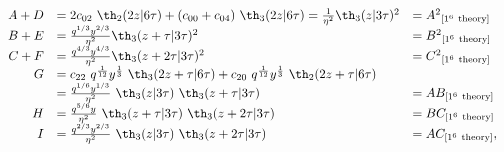 \begin{equation} \label{1^6-4^3}
  \begin{array}{rll}
A+D &= 2 c_{02} ~\th_2(2z|6\tau) +(c_{00}+c_{04}) ~\th_3(2z|6\tau)
= {1\over \eta^2} \th_3(z|3\tau)^2 &= A^2{ }_{[1^6 ~{\rm theory}]} \\
B+E &= {q^{1/3} y^{2/3}\over \eta^2} \th_3 (z+\tau|3\tau)^2 &= B^2{ }_{[1^6 ~{\rm theory}]} \\
C+F &= {q^{4/3} y^{4/3}\over \eta^2} \th_3 (z+2\tau|3\tau)^2 &= C^2{ }_{[1^6 ~{\rm theory}]} \\
G &= c_{22} ~q^{1\over 12} y^{1\over 3} ~\th_3(2z+\tau|6\tau) + 
 c_{20} ~q^{1\over 12} y^{1\over 3} ~\th_2(2z+\tau|6\tau) & \\
&= {q^{1/6} y^{1/3} \over \eta^2} ~\th_3(z|3\tau)~\th_3(z+\tau|3\tau) &= AB_{[1^6 ~{\rm theory}]} \\
H &= {q^{5/6} y \over \eta^2} ~\th_3(z+\tau|3\tau)~\th_3(z+2\tau|3\tau) &= BC_{[1^6 ~{\rm theory}]} \\
I &= {q^{2/3} y^{2/3} \over \eta^2} ~\th_3(z|3\tau)~\th_3(z+2\tau|3\tau) &= AC_{[1^6 ~{\rm theory}]},
  \end{array}
\end{equation}

